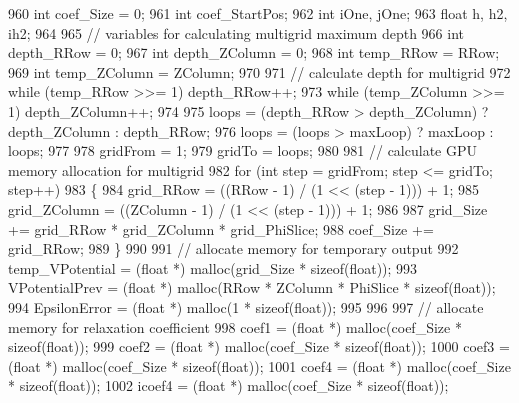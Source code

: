 \begin{DoxyCode}
960     \textcolor{keywordtype}{int} coef\_Size = 0;
961     \textcolor{keywordtype}{int} coef\_StartPos;
962     \textcolor{keywordtype}{int} iOne, jOne;
963     \textcolor{keywordtype}{float} h, h2, ih2;
964 
965     \textcolor{comment}{// variables for calculating multigrid maximum depth}
966     \textcolor{keywordtype}{int} depth\_RRow = 0;
967     \textcolor{keywordtype}{int} depth\_ZColumn = 0;
968     \textcolor{keywordtype}{int} temp\_RRow = RRow;
969     \textcolor{keywordtype}{int} temp\_ZColumn = ZColumn;
970 
971     \textcolor{comment}{// calculate depth for multigrid}
972     \textcolor{keywordflow}{while} (temp\_RRow >>= 1) depth\_RRow++;  
973     \textcolor{keywordflow}{while} (temp\_ZColumn >>= 1) depth\_ZColumn++;
974   
975     loops = (depth\_RRow > depth\_ZColumn) ? depth\_ZColumn : depth\_RRow;
976     loops = (loops > maxLoop) ? maxLoop : loops;
977 
978     gridFrom = 1;
979     gridTo = loops;
980 
981     \textcolor{comment}{// calculate GPU memory allocation for multigrid}
982     \textcolor{keywordflow}{for} (\textcolor{keywordtype}{int} step = gridFrom; step <= gridTo; step++)
983     \{
984         grid\_RRow = ((RRow - 1) / (1 << (step - 1))) + 1;
985         grid\_ZColumn = ((ZColumn - 1) / (1 << (step - 1))) + 1;
986         
987         grid\_Size += grid\_RRow * grid\_ZColumn * grid\_PhiSlice;
988         coef\_Size += grid\_RRow;
989     \}
990 
991     \textcolor{comment}{// allocate memory for temporary output}
992     temp\_VPotential         = (\textcolor{keywordtype}{float} *) malloc(grid\_Size * \textcolor{keyword}{sizeof}(\textcolor{keywordtype}{float}));
993     VPotentialPrev = (\textcolor{keywordtype}{float} *) malloc(RRow * ZColumn * PhiSlice * \textcolor{keyword}{sizeof}(\textcolor{keywordtype}{float}));
994     EpsilonError = (\textcolor{keywordtype}{float} *) malloc(1 * \textcolor{keyword}{sizeof}(\textcolor{keywordtype}{float}));
995 
996 
997     \textcolor{comment}{// allocate memory for relaxation coefficient}
998     coef1 = (\textcolor{keywordtype}{float} *) malloc(coef\_Size * \textcolor{keyword}{sizeof}(\textcolor{keywordtype}{float}));
999     coef2 = (\textcolor{keywordtype}{float} *) malloc(coef\_Size * \textcolor{keyword}{sizeof}(\textcolor{keywordtype}{float}));
1000     coef3 = (\textcolor{keywordtype}{float} *) malloc(coef\_Size * \textcolor{keyword}{sizeof}(\textcolor{keywordtype}{float}));
1001     coef4 = (\textcolor{keywordtype}{float} *) malloc(coef\_Size * \textcolor{keyword}{sizeof}(\textcolor{keywordtype}{float}));
1002     icoef4 = (\textcolor{keywordtype}{float} *) malloc(coef\_Size * \textcolor{keyword}{sizeof}(\textcolor{keywordtype}{float}));

\end{DoxyCode}
